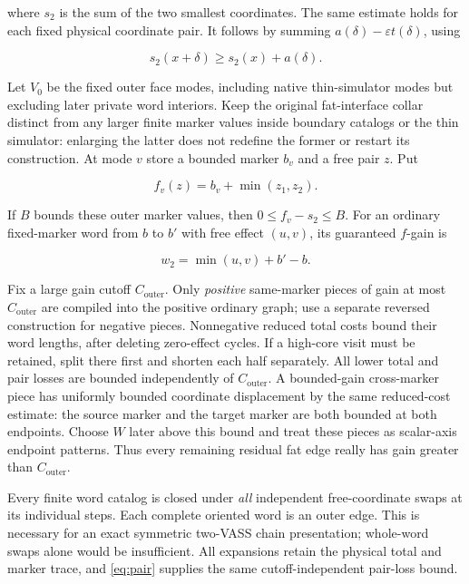 \documentclass[11pt,a4paper]{article}
\theoremstyle{remark}
\newcommand{\Co}{C_{\mathrm{outer}}}
\begin{document}
where \(s_2\) is the sum of the two smallest coordinates. The same estimate holds for each fixed physical coordinate pair. It follows by summing \(a(\delta)-\varepsilon t(\delta)\), using

\begin{equation*}
s_2(x+\delta)\geq s_2(x)+a(\delta).
\end{equation*}


Let \(V_0\) be the fixed outer face modes, including native thin-simulator modes but excluding later private word interiors. Keep the original fat-interface collar distinct from any larger finite marker values inside boundary catalogs or the thin simulator: enlarging the latter does not redefine the former or restart its construction. At mode \(v\) store a bounded marker \(b_v\) and a free pair \(z\). Put

\begin{equation*}
f_v(z)=b_v+\min(z_1,z_2).
\end{equation*}


If \(B\) bounds these outer marker values, then \(0\leq f_v-s_2\leq B\). For an ordinary fixed-marker word from \(b\) to \(b'\) with free effect \((u,v)\), its guaranteed \(f\)-gain is

\begin{equation}
w_2=\min(u,v)+b'-b. \label{eq:ordinary-weight}
\end{equation}


Fix a large gain cutoff \(\Co\). Only \emph{positive} same-marker pieces of gain at most \(\Co\) are compiled into the positive ordinary graph; use a separate reversed construction for negative pieces. Nonnegative reduced total costs bound their word lengths, after deleting zero-effect cycles. If a high-core visit must be retained, split there first and shorten each half separately. All lower total and pair losses are bounded independently of \(\Co\). A bounded-gain cross-marker piece has uniformly bounded coordinate displacement by the same reduced-cost estimate: the source marker and the target marker are both bounded at both endpoints. Choose \(W\) later above this bound and treat these pieces as scalar-axis endpoint patterns. Thus every remaining residual fat edge really has gain greater than \(\Co\).

Every finite word catalog is closed under \emph{all} independent free-coordinate swaps at its individual steps. Each complete oriented word is an outer edge. This is necessary for an exact symmetric two-VASS chain presentation; whole-word swaps alone would be insufficient. All expansions retain the physical total and marker trace, and \eqref{eq:pair} supplies the same cutoff-independent pair-loss bound.
\end{document}
